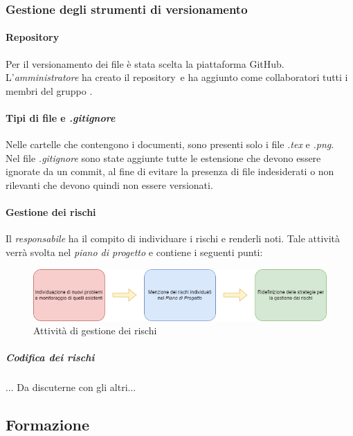     \subsubsection{Gestione degli strumenti di versionamento}
      \paragraph{Repository\glo}
        Per il versionamento dei file è stata scelta la piattaforma GitHub\glo. L'\textit{amministratore} ha creato il repository\glo\ e ha aggiunto 
        come collaboratori tutti i membri del gruppo \groupName.

      \paragraph{Tipi di file e \textit{.gitignore}}
        Nelle cartelle che contengono i documenti, sono presenti solo i file \textit{.tex} e \textit{.png}.\\
        Nel file \textit{.gitignore} sono state aggiunte tutte le estensione che devono essere ignorate da un commit, al fine di evitare la presenza di file indesiderati 
        o non rilevanti che devono quindi non essere versionati.
    \paragraph {Gestione dei rischi}
      Il \textit{responsabile} ha il compito di individuare i rischi e renderli noti. Tale attività verrà svolta nel \textit{piano di progetto} e contiene i seguenti punti:
      \begin{figure}[htbp]
        \centering 
         \includegraphics[scale =0.7]{../template/images/NdP/GestioneRischi.png}
         \caption{Attività di gestione dei rischi}
      \end {figure}
      
      \subparagraph {Codifica dei rischi}
        ... Da discuterne con gli altri...



        \subsection{Formazione} \label{subsection: formazione}
